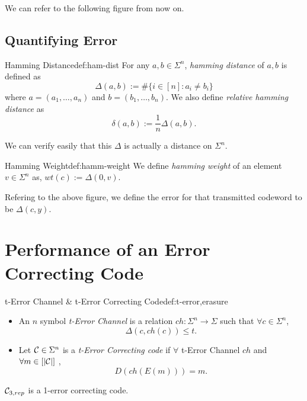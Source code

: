 We can refer to the following figure from now on.

\subsection*{Quantifying Error}
\begin{definition}{Hamming Distance}{def:ham-dist}
For any $a, b\in\Sigma^n$, \textit{hamming distance} of $a,b$ is defined as
\[
\Delta(a,b) := \# \{i\in[n] : a_i\neq b_i\}
\]
where $a = (a_1,\ldots, a_n)$ and $b = (b_1, \ldots, b_n)$. We also define \textit{relative hamming distance} as 
\[
\delta (a,b) := \frac{1}{n}\Delta(a,b).
\]
\end{definition}
\begin{remark}
We can verify easily that this $\Delta$ is actually a distance on $\Sigma^n$.
\end{remark}

\begin{definition}{Hamming Weight}{def:hamm-weight}
We define \textit{hamming weight} of an element $v\in\Sigma^n$ as, $wt(c) := \Delta(0,v)$.
\end{definition}

Refering to the above figure, we define the error for that transmitted codeword to be $\Delta(c,y)$.

\section{Performance of an Error Correcting Code}

\begin{definition}{t-Error Channel \& t-Error Correcting Code}{def:t-error,erasure}
	\begin{itemize}
\item {} An $n$ symbol \textit{t-Error Channel} is a relation $ch : \Sigma^n\to \Sigma$ such that $\forall c\in\Sigma^n$, 
\[
\Delta(c, ch(c))\leq t.
\]
\item {} Let $\mathcal{C}\in\Sigma^n$ is a \textit{t-Error Correcting code} if $\forall$ t-Error Channel $ch$ and $\forall m\in[|\mathcal{C}|]$ ,
\[
D(ch(E(m))) = m.
\]
	\end{itemize}

\end{definition}
\begin{example}
$\mathcal{C}_{3,rep}$ is a 1-error correcting code.
\end{example}
